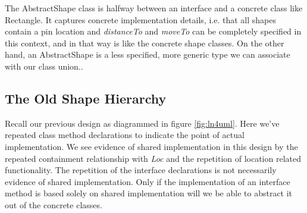 \documentclass[]{tufte-handout}
\begin{document}
The AbstractShape class is halfway between an interface and a concrete class like Rectangle. It captures concrete implementation details, i.e. that all shapes contain a pin location and \textit{distanceTo} and \textit{moveTo} can be completely specified in this context, and in that way is like the concrete shape classes.  On the other hand, an AbstractShape is a less specified, more generic type we can associate with our class union.. 

\subsection{The Old Shape Hierarchy}

Recall our previous design as diagrammed in figure \ref{fig:ln4uml}. Here we've repeated class method declarations to indicate the point of actual implementation. We see evidence of shared implementation in this design by the repeated containment relationship with \textit{Loc} and the repetition of location related functionality. The repetition of the interface declarations is not necessarily evidence of shared implementation. Only if the implementation of an interface method is based solely on shared implementation will we be able to abstract it out of the concrete classes. 
\end{document}
